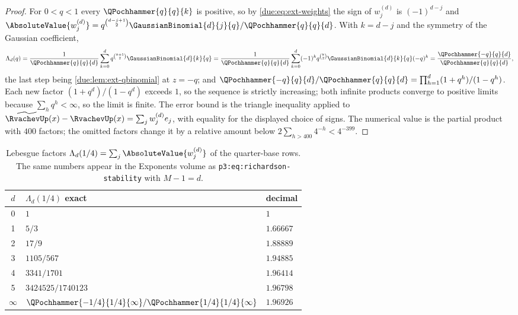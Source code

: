 \documentclass[11pt,oneside]{article}
\theoremstyle{plain}
\theoremstyle{definition}
\theoremstyle{remark}
\newcommand{\Wrow}[2]{w^{(#1)}_{#2}}                        %
\begin{document}
\begin{proof}
For $0<q<1$ every $\QPochhammer{q}{q}{k}$ is positive, so by
\cref{due:eq:ext-weights} the sign of $\Wrow{d}{j}$ is $(-1)^{d-j}$ and
$\AbsoluteValue{\Wrow{d}{j}}=q^{\binom{d-j+1}{2}}\GaussianBinomial{d}{j}{q}/\QPochhammer{q}{q}{d}$.
With $k=d-j$ and the symmetry of the Gaussian coefficient,
\[
 \Lambda_{d}(q)
 =\frac{1}{\QPochhammer{q}{q}{d}}\sum_{k=0}^{d}q^{\binom{k+1}{2}}\GaussianBinomial{d}{k}{q}
 =\frac{1}{\QPochhammer{q}{q}{d}}\sum_{k=0}^{d}(-1)^{k}q^{\binom{k}{2}}
  \GaussianBinomial{d}{k}{q}(-q)^{k}
 =\frac{\QPochhammer{-q}{q}{d}}{\QPochhammer{q}{q}{d}},
\]
the last step being \cref{due:lem:ext-qbinomial} at $z=-q$; and
$\QPochhammer{-q}{q}{d}/\QPochhammer{q}{q}{d}=\prod_{h=1}^{d}(1+q^{h})/(1-q^{h})$.
Each new factor $(1+q^{d})/(1-q^{d})$ exceeds $1$, so the sequence is
strictly increasing; both infinite products converge to positive limits
because $\sum_{h}q^{h}<\infty$, so the limit is finite.  The error bound is
the triangle inequality applied to
$\widetilde{\RvachevUp}(x)-\RvachevUp(x)=\sum_{j}\Wrow{d}{j}e_{j}$, with
equality for the displayed choice of signs.  The numerical value is the
partial product with $400$ factors; the omitted factors change it by a
relative amount below $2\sum_{h>400}4^{-h}<4^{-399}$.
\end{proof}

\begin{table}[htbp]
\centering
\caption{Lebesgue factors $\Lambda_{d}(1/4)=\sum_{j}\AbsoluteValue{\Wrow{d}{j}}$
of the quarter-base rows.  The same numbers appear in the Exponents volume
\cite{proveit-exponents} as \texttt{p3:eq:richardson-\allowbreak stability} with $M-1=d$.}
\label{due:tab:stab-lebesgue}
\begin{tabular}{c@{\qquad}l@{\qquad}l}
\toprule
$d$ & $\Lambda_{d}(1/4)$ exact & decimal\\
\midrule
0 & $1$ & $1$\\
1 & $5/3$ & $1.66667$\\
2 & $17/9$ & $1.88889$\\
3 & $1105/567$ & $1.94885$\\
4 & $3341/1701$ & $1.96414$\\
5 & $3424525/1740123$ & $1.96798$\\
$\infty$ & $\QPochhammer{-1/4}{1/4}{\infty}/\QPochhammer{1/4}{1/4}{\infty}$ & $1.96926$\\
\bottomrule
\end{tabular}
\end{table}
\end{document}
